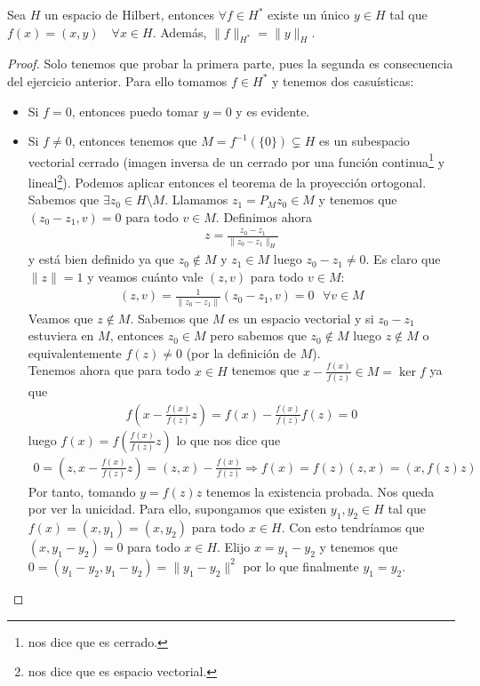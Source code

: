\begin{teo} 
    Sea $H$ un espacio de Hilbert, entonces $\forall f \in H^*$ existe un único $y\in H$ tal que $f(x)=(x,y)$\ \ $\forall x \in H$. Además, $\|f\|_{H^*}=\|y\|_H$.

    \begin{proof}
        Solo tenemos que probar la primera parte, pues la segunda es consecuencia del ejercicio anterior. Para ello tomamos $f\in H^*$ y tenemos dos casuísticas:
        \begin{itemize}
            \item Si $f=0$, entonces puedo tomar $y=0$ y es evidente.
            \item Si $f\neq 0$, entonces tenemos que $M=f^{-1}(\{0\})\varsubsetneq H$ es un subespacio vectorial cerrado (imagen inversa de un cerrado por una función continua\footnote{nos dice que es cerrado.} y lineal\footnote{nos dice que es espacio vectorial.}). Podemos aplicar entonces el teorema de la proyección ortogonal. Sabemos que $\exists z_0 \in H\setminus M$. Llamamos $z_1=P_Mz_0\in M$ y tenemos que $(z_0-z_1, v) = 0$ para todo $v\in M$. Definimos ahora
            \begin{gather*}
                z = \frac{z_0-z_1}{\|z_0-z_1\|_H}
            \end{gather*}
            y está bien definido ya que $z_0\notin M$ y $z_1 \in M$ luego $z_0-z_1\neq 0$. Es claro que $\|z\| = 1$ y veamos cuánto vale $(z,v)$ para todo $v\in M$:
            \begin{gather*}
                (z,v) = \frac{1}{\|z_0-z_1\|}(z_0-z_1,v) = 0\ \ \ \forall v \in M
            \end{gather*}
            Veamos que $z\notin M$. Sabemos que $M$ es un espacio vectorial y si $z_0-z_1$ estuviera en $M$, entonces $z_0\in M$ pero sabemos que $z_0\notin M$ luego $z\notin M$ o equivalentemente $f(z)\neq 0$ (por la definición de $M$).\\

            Tenemos ahora que para todo $x\in H$ tenemos que $x-\frac{f(x)}{f(z)}\in M = \ker f$ ya que
            \begin{gather*}
                f\left(x - \frac{f(x)}{f(z)}z\right) = f(x)-\frac{f(x)}{f(z)}f(z) = 0
            \end{gather*}
            luego $f(x) = f\left(\frac{f(x)}{f(z)}z\right)$ lo que nos dice que
            \begin{gather*}
                0 = \left(z, x - \frac{f(x)}{f(z)}z\right) = (z,x) - \frac{f(x)}{f(z)} \Rightarrow f(x) = f(z)(z,x) = (x, f(z)z)
            \end{gather*}
            Por tanto, tomando $y=f(z)z$ tenemos la existencia probada. Nos queda por ver la unicidad. Para ello, supongamos que existen $y_1,y_2\in H$ tal que $f(x)=(x,y_1)=(x,y_2)$ para todo $x\in H$. Con esto tendríamos que $(x, y_1-y_2) = 0$ para todo $x\in H$. Elijo $x = y_1-y_2$ y tenemos que $0 =(y_1-y_2, y_1-y_2) = \|y_1-y_2\|^2$ por lo que finalmente $y_1=y_2$.
        \end{itemize}
    \end{proof}
\end{teo}

